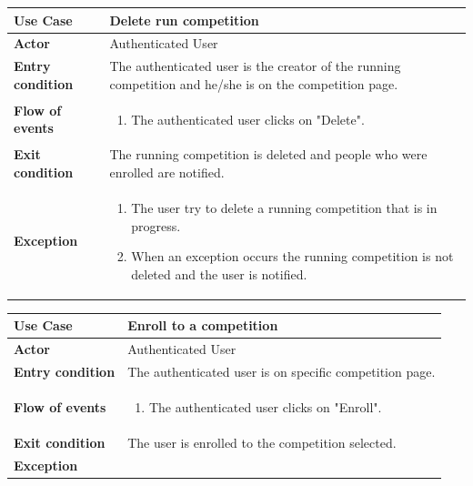 \documentclass[../main.tex]{subfiles}
\begin{document}
	\vspace*{3cm}
	\begin{center}
		\begin{tabular}{p{3cm}p{8.28cm}}
			\hline
			\textbf{Use Case} & Delete run competition\\
			\hline
			\textbf{Actor} & Authenticated User\\
			\hline
			\textbf{Entry condition} & The authenticated user is the creator of the running competition and he/she is on the competition page.\\
			\hline
			\textbf{Flow of events} & \begin{enumerate}
				\linespread{0}\item The authenticated user clicks on "Delete".
			\end{enumerate}\\
			\hline
			\textbf{Exit condition} & The running competition is deleted and people who were enrolled are notified.\\
			\hline
			\textbf{Exception}& \begin{enumerate}
				\linespread{0}\item The user try to delete a running competition that is in progress.
				\linespread{0}\item When an exception occurs the running competition is not deleted and the user is notified.
			\end{enumerate}\\
			\hline
		\end{tabular}
	\end{center}
	\vspace*{3cm}
	\begin{center}
		\begin{tabular}{p{3cm}p{8.28cm}}
			\hline
			\textbf{Use Case} & Enroll to a competition\\
			\hline
			\textbf{Actor} & Authenticated User\\
			\hline
			\textbf{Entry condition} & The authenticated user is on specific competition page.\\
			\hline
			\textbf{Flow of events} & \begin{enumerate}
				\linespread{0}\item The authenticated user clicks on "Enroll".
			\end{enumerate}\\
			\hline
			\textbf{Exit condition} & The user is enrolled to the competition selected.\\
			\hline
			\textbf{Exception}\\
			\hline
		\end{tabular}
	\end{center}
\end{document}
